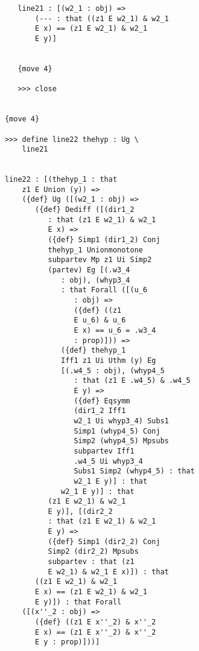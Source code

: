 \documentclass[12pt]{article}
\begin{document}
\begin{verbatim}
               line21 : [(w2_1 : obj) => 
                   (--- : that ((z1 E w2_1) & w2_1 
                   E x) == (z1 E w2_1) & w2_1 
                   E y)]


               {move 4}

               >>> close


            {move 4}

            >>> define line22 thehyp : Ug \
                line21


            line22 : [(thehyp_1 : that 
                z1 E Union (y)) => 
                ({def} Ug ([(w2_1 : obj) => 
                   ({def} Dediff ([(dir1_2 
                      : that (z1 E w2_1) & w2_1 
                      E x) => 
                      ({def} Simp1 (dir1_2) Conj 
                      thehyp_1 Unionmonotone 
                      subpartev Mp z1 Ui Simp2 
                      (partev) Eg [(.w3_4 
                         : obj), (whyp3_4 
                         : that Forall ([(u_6 
                            : obj) => 
                            ({def} ((z1 
                            E u_6) & u_6 
                            E x) == u_6 = .w3_4 
                            : prop)])) => 
                         ({def} thehyp_1 
                         Iff1 z1 Ui Uthm (y) Eg 
                         [(.w4_5 : obj), (whyp4_5 
                            : that (z1 E .w4_5) & .w4_5 
                            E y) => 
                            ({def} Eqsymm 
                            (dir1_2 Iff1 
                            w2_1 Ui whyp3_4) Subs1 
                            Simp1 (whyp4_5) Conj 
                            Simp2 (whyp4_5) Mpsubs 
                            subpartev Iff1 
                            .w4_5 Ui whyp3_4 
                            Subs1 Simp2 (whyp4_5) : that 
                            w2_1 E y)] : that 
                         w2_1 E y)] : that 
                      (z1 E w2_1) & w2_1 
                      E y)], [(dir2_2 
                      : that (z1 E w2_1) & w2_1 
                      E y) => 
                      ({def} Simp1 (dir2_2) Conj 
                      Simp2 (dir2_2) Mpsubs 
                      subpartev : that (z1 
                      E w2_1) & w2_1 E x)]) : that 
                   ((z1 E w2_1) & w2_1 
                   E x) == (z1 E w2_1) & w2_1 
                   E y)]) : that Forall 
                ([(x''_2 : obj) => 
                   ({def} ((z1 E x''_2) & x''_2 
                   E x) == (z1 E x''_2) & x''_2 
                   E y : prop)]))]



\end{verbatim}
\end{document}
